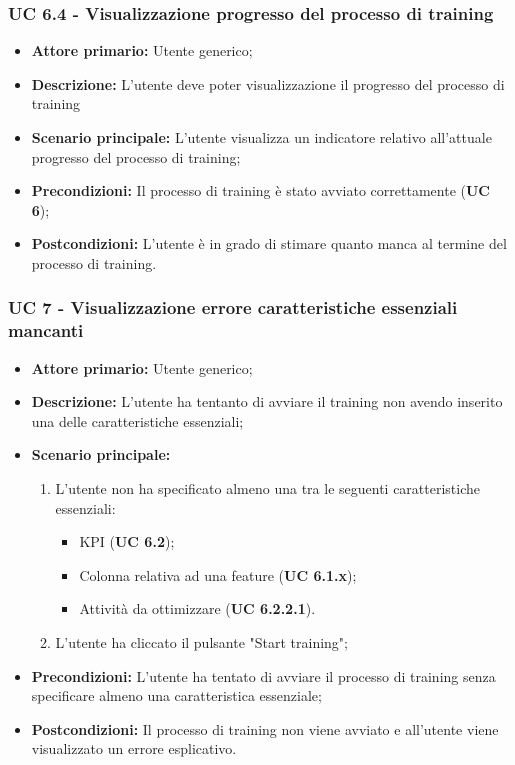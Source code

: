 \subsubsection{UC 6.4 - Visualizzazione progresso del processo di training}
\begin{itemize}
	\item \textbf{Attore primario:} Utente generico;
	\item \textbf{Descrizione:} L'utente deve poter visualizzazione il progresso del processo di training
	\item \textbf{Scenario principale:} L'utente visualizza un indicatore relativo all'attuale progresso del processo di training;
	\item \textbf{Precondizioni:} Il processo di training è stato avviato correttamente (\textbf{UC 6});
	\item \textbf{Postcondizioni:} L'utente è in grado di stimare quanto manca al termine del processo di training.
\end{itemize}


\subsubsection{UC 7 - Visualizzazione errore caratteristiche essenziali mancanti}
\begin{itemize}
	\item \textbf{Attore primario:} Utente generico;
	\item \textbf{Descrizione:} L'utente ha tentanto di avviare il training non avendo inserito una delle caratteristiche essenziali;
	\item \textbf{Scenario principale:}
		\begin{enumerate}
			\item L'utente non ha specificato almeno una tra le seguenti caratteristiche essenziali:
				\begin{itemize}
					\item KPI (\textbf{UC 6.2});
					\item Colonna relativa ad una feature (\textbf{UC 6.1.x});
					\item Attività da ottimizzare (\textbf{UC 6.2.2.1}).
				\end{itemize}
			\item L'utente ha cliccato il pulsante "Start training";
			
		\end{enumerate}
	\item \textbf{Precondizioni:} L'utente ha tentato di avviare il processo di training senza specificare almeno una caratteristica essenziale; 
	\item \textbf{Postcondizioni:} Il processo di training non viene avviato e all'utente viene visualizzato un errore esplicativo.
\end{itemize}


